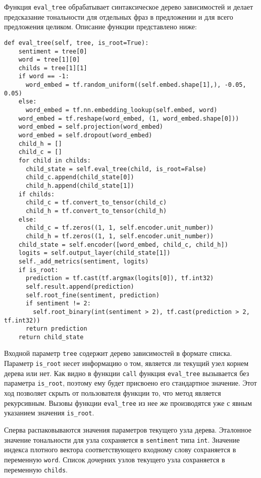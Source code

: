 Функция \texttt{eval\_tree} обрабатывает синтаксическое дерево зависимостей и делает предсказание тональности для отдельных фраз в предложении и для всего предложения целиком. Описание функции представлено ниже:
\medskip
\begin{lstlisting}[style=Python]
  def eval_tree(self, tree, is_root=True):
    sentiment = tree[0]
    word = tree[1][0]
    childs = tree[1][1]
    if word == -1:
      word_embed = tf.random_uniform((self.embed.shape[1],), -0.05, 0.05)
    else:
      word_embed = tf.nn.embedding_lookup(self.embed, word)
    word_embed = tf.reshape(word_embed, (1, word_embed.shape[0]))
    word_embed = self.projection(word_embed)
    word_embed = self.dropout(word_embed)
    child_h = []
    child_c = []
    for child in childs:
      child_state = self.eval_tree(child, is_root=False)
      child_c.append(child_state[0])
      child_h.append(child_state[1])
    if childs:
      child_c = tf.convert_to_tensor(child_c)
      child_h = tf.convert_to_tensor(child_h)
    else:
      child_c = tf.zeros((1, 1, self.encoder.unit_number))
      child_h = tf.zeros((1, 1, self.encoder.unit_number))
    child_state = self.encoder([word_embed, child_c, child_h])
    logits = self.output_layer(child_state[1])
    self._add_metrics(sentiment, logits)
    if is_root:
      prediction = tf.cast(tf.argmax(logits[0]), tf.int32)
      self.result.append(prediction)
      self.root_fine(sentiment, prediction)
      if sentiment != 2:
        self.root_binary(int(sentiment > 2), tf.cast(prediction > 2, tf.int32))
      return prediction
    return child_state
\end{lstlisting}
\medskip

Входной параметр \texttt{tree} содержит дерево зависимостей в формате спи\-ска. Параметр \texttt{is\_root} несет информацию о том, является ли текущий узел корнем дерева или нет. Как видно в функции \texttt{call} функция \texttt{eval\_tree} вызывается без параметра \texttt{is\_root}, поэтому ему будет присвоено его стандартное значение. Этот ход позволяет скрыть от пользователя функции то, что метод является рекурсивным. Вызовы функции \texttt{eval\_tree} из нее же производятся уже с явным указанием значения \texttt{is\_root}.

Сперва распаковываются значения параметров текущего узла дерева. Эталонное значение тональности для узла сохраняется в \texttt{sentiment} типа \texttt{int}. Значение индекса плотного вектора соответствующего входному слову сохраняется в переменную \texttt{word}. Список дочерних узлов текущего узла сохраняется в переменную \texttt{childs}.

